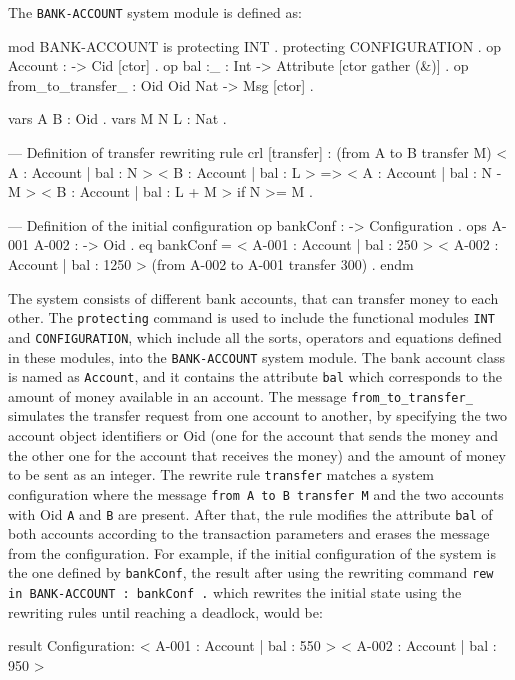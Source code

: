 \begin{example}
\normalfont
The \texttt{BANK-ACCOUNT} system module is defined as: 
\\
\begin{maude}
mod BANK-ACCOUNT is
    protecting INT .
    protecting CONFIGURATION .
    op Account : -> Cid [ctor] .
    op bal :_ : Int -> Attribute [ctor gather (&)] .
    op from_to_transfer_ : Oid Oid Nat -> Msg [ctor] .
    
    vars A B : Oid .
    vars M N L : Nat .

    --- Definition of transfer rewriting rule
    crl [transfer] :
      (from A to B transfer M)
      < A : Account | bal : N >
      < B : Account | bal : L >
      => < A : Account | bal : N - M >
         < B : Account | bal : L + M >
      if N >= M .

    --- Definition of the initial configuration
    op bankConf : -> Configuration .
    ops A-001 A-002 : -> Oid .
    eq bankConf
    = < A-001 : Account | bal : 250 >
      < A-002 : Account | bal : 1250 >
      (from A-002 to A-001 transfer 300) .
endm
\end{maude}
The system consists of different bank accounts, that can transfer money to each other. The \texttt{protecting} command is used to include the functional modules \texttt{INT} and \texttt{CONFIGURATION}, which include all the sorts, operators and equations defined in these modules, into the \texttt{BANK-ACCOUNT} system module. The bank account class is named as \texttt{Account}, and it contains the attribute \texttt{bal} which corresponds to the amount of money available in an account. The message \texttt{from\_to\_transfer\_} simulates the transfer request from one account to another, by specifying the two account object identifiers or Oid (one for the account that sends the money and the other one for the account that receives the money) and the amount of money to be sent as an integer. The rewrite rule \texttt{transfer} matches a system configuration where the message \texttt{from A to B transfer M} and the two accounts with Oid \texttt{A} and \texttt{B} are present. After that, the rule modifies the attribute \texttt{bal} of both accounts according to the transaction parameters and erases the message from the configuration. For example, if the initial configuration of the system is the one defined by \texttt{bankConf}, the result after using the rewriting command \texttt{rew in BANK-ACCOUNT : bankConf .} which rewrites the initial state using the rewriting rules until reaching a deadlock, would be:
\\
\begin{maude2}
result Configuration: < A-001 : Account | bal : 550 > 
                      < A-002 : Account | bal : 950 >
\end{maude2}

\end{example}

